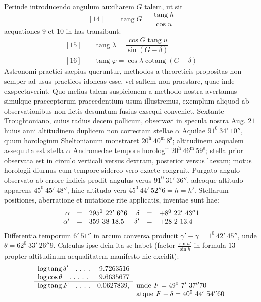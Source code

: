 Perinde introducendo angulum auxiliarem $G$ talem, ut sit
\[
{}[14]\qquad\operatorname{tang}G=\frac{\operatorname{tang}h}{\cos u}
\]
aequationes $9$ et $10$ in has transibunt:
\[
\begin{array}{rl}
{}[15]\quad&\operatorname{tang}\lambda=\dfrac{\cos G\operatorname{tang}u}{\sin(G-\delta)}\\[5pt]
{}[16]\quad&\operatorname{tang}\varphi=\cos\lambda\operatorname{cotang}(G-\delta)
\end{array}
\]
Astronomi practici saepius queruntur, methodos a theoreticis propositas non semper ad usus practicos idoneas esse, vel saltem non praestare, quae inde exspectaverint. Quo melius talem suspicionem a methodo nostra avertamus simulque praeceptorum praecedentium usum illustremus, exemplum aliquod ab observationibus non fictis desumtum fusius exsequi conveniet. Sextante Troughtoniano, cuius radius decem pollicum, observavi in specula nostra Aug. $21$ huius anni altitudinem duplicem non correctam stellae $\alpha$ Aquilae $91^0\ 34'\ 10''$, quum horologium Sheltonianum monstraret $20^{\mathrm h}\ 40^{\mathrm m}\ 8^{\mathrm s}$; altitudinem aequalem assequuta est stella $\alpha$ Andromedae tempore horologii $20^{\mathrm h}\ 46^{\mathrm m}\ 59^{\mathrm s}$; stella prior observata est in circulo verticali versus dextram, posterior versus laevam; motus horologii diurnus cum tempore sidereo vero exacte congruit. Purgato angulo observato ab errore indicis prodit angulus verus $91^0\ 31'\ 36''$, adeoque altitudo apparens $45^0\ 45'\ 48''$, hinc altitudo vera $45^0\ 44'\ 52''6=h=h'$. Stellarum positiones, aberratione et nutatione rite applicatis, inventae sunt hae:
\[
\begin{array}{rcl@{\quad}rcl}
\alpha&=&295^0\ 22'\ 6''6&\delta&=&+8^0\ 22'\ 43''1\\
\alpha'&=&359\ 38\ 18.5&\delta'&=&+28\ 2\ 13.4
\end{array}
\]
Differentia temporum $6'\ 51''$ in arcum conversa producit $\gamma'-\gamma=1^0\ 42'\ 45''$, unde $\theta=62^0\ 33'\ 26''9$. Calculus ipse dein ita se habet (factor $\frac{\sin h'}{\sin h}$ in formula $13$ propter altitudinum aequalitatem manifesto hic excidit):
\[
\begin{array}{lrl}
\log\operatorname{tang}\delta'\quad .\ .\ .\ .&9.7263516&\\
\log\cos\theta\quad .\ .\ .\ .\ .&9.6635677&\\\cline{1-2}
\log\operatorname{tang}F\quad .\ .\ .\ .&0.0627839,&\text{unde }F=49^0\ 7'\ 37''70\\
&&\text{atque }F-\delta=40^0\ 44'\ 54''60
\end{array}
\]
